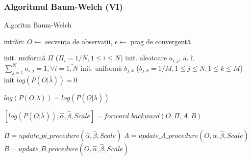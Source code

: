 \begin{frame}[fragile, t]
	\frametitle{Algoritmul Baum-Welch (VI)}	
	\vspace*{-1em}
	\begin{algorithm}[H]
		\scriptsize
      	\caption{Algoritm Baum-Welch}
      	\label{alg-baum-welch}
      	 
      	\begin{algorithmic}[1]
      		\STATE intrări: $O \leftarrow$ secvența de observații, $\epsilon \leftarrow$ prag de convergență
      		
      		\STATE {}
      		\STATE init. uniformă $\Pi$ ($\Pi_i = 1/N, 1 \le i \le N$)
      		\STATE init. aleatoare $a_{i,j}$, a. î. $\sum_{j=1}^{N}a_{i,j} = 1, \forall{i} = \bar{1, N}$ 
      		\STATE init. uniformă $b_{j,k}$ ($b_{j,k} = 1/M, 1 \le j \le N, 1 \le k \le M$)
      		\STATE init $log(P(O \vert \bar{\lambda})) = 0$
			\vspace*{0.5em}
      		
      		\REPEAT
				\STATE $log(P(O \vert \lambda)) = log(P(O \vert \bar{\lambda}))$
				
      			\STATE {}
				\STATE $[log(P(O \vert \bar{\lambda})), \hat{\alpha}, \hat{\beta}, Scale] 
				= forward\_backward(O, \Pi, A, B)$
				
				\STATE {}
				\STATE $\Pi = update\_pi\_procedure(\hat{\alpha}, \hat{\beta}, Scale)$
				\STATE $A = update\_A\_procedure(O, \hat{\alpha}, \hat{\beta}, Scale)$
				\STATE $B = update\_B\_procedure(O, \hat{\alpha}, \hat{\beta}, Scale)$
				
		\end{algorithmic}
	\end{algorithm}  
\end{frame}


